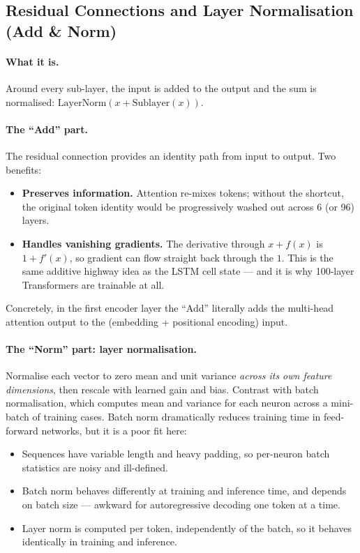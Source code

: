 \documentclass[11pt,a4paper]{article}
\begin{document}
\subsection{Residual Connections and Layer Normalisation (Add \& Norm)}

\paragraph{What it is.} Around every sub-layer, the input is added to the output and the sum
is normalised: $\mathrm{LayerNorm}(x + \mathrm{Sublayer}(x))$.

\paragraph{The ``Add'' part.} The residual connection provides an identity path from input to
output. Two benefits:
\begin{itemize}
\item \textbf{Preserves information.} Attention re-mixes tokens; without the shortcut, the
  original token identity would be progressively washed out across 6 (or 96) layers.
\item \textbf{Handles vanishing gradients.} The derivative through $x + f(x)$ is
  $1 + f'(x)$, so gradient can flow straight back through the $1$. This is the same additive
  highway idea as the LSTM cell state --- and it is why 100-layer Transformers are trainable
  at all.
\end{itemize}
Concretely, in the first encoder layer the ``Add'' literally adds the multi-head attention
output to the (embedding + positional encoding) input.

\paragraph{The ``Norm'' part: layer normalisation.} Normalise each vector to zero mean and
unit variance \emph{across its own feature dimensions}, then rescale with learned gain and
bias. Contrast with batch normalisation, which computes mean and variance for each neuron
across a mini-batch of training cases. Batch norm dramatically reduces training time in
feed-forward networks, but it is a poor fit here:
\begin{itemize}
\item Sequences have variable length and heavy padding, so per-neuron batch statistics are
  noisy and ill-defined.
\item Batch norm behaves differently at training and inference time, and depends on batch
  size --- awkward for autoregressive decoding one token at a time.
\item Layer norm is computed per token, independently of the batch, so it behaves
  identically in training and inference.
\end{itemize}
\end{document}
